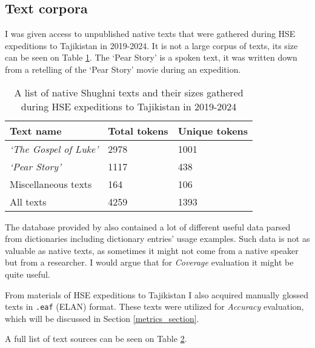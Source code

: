 \subsection{Text corpora}
I was given access to unpublished native texts that were gathered during HSE expeditions to Tajikistan in 2019-2024. It is not a large corpus of texts, its size can be seen on Table \hyperref[Tab:native_texts]{1}. The `Pear Story' is a spoken text, it was written down from a retelling of the `Pear Story' movie during an expedition.

\begin{table}[!h]
    \begin{center}
        \begin{tabular}{|l|l|l|}
            \hline
            \textbf{Text name} & \textbf{Total tokens} & \textbf{Unique tokens} \\
            \hline
            \textit{`The Gospel of Luke'} & 2978 & 1001 \\
            \textit{`Pear Story'} & 1117 & 438 \\
            Miscellaneous texts & 164 & 106 \\
            \hline
            All texts & 4259 & 1393 \\
            \hline
        \end{tabular}
        \label{Tab:native_texts}
        \caption{A list of native Shughni texts and their sizes gathered during HSE expeditions to Tajikistan in 2019-2024}
    \end{center}
\end{table}

The database provided by \textcite{makarov_digital_2022} also contained a lot of different useful data parsed from dictionaries including dictionary entries' usage examples. Such data is not as valuable as native texts, as sometimes it might not come from a native speaker but from a researcher. I would argue that for \textit{Coverage} evaluation it might be quite useful. 

From materials of HSE expeditions to Tajikistan I also acquired manually glossed texts in \texttt{.eaf} (ELAN) format. These texts were utilized for \textit{Accuracy} evaluation, which will be discussed in Section \ref{metrics_section}. 

A full list of text sources can be seen on Table \hyperref[Tab:all_texts]{2}.


